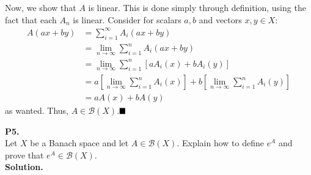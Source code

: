 \documentclass{article}
\begin{document}
    Now, we show that $A$ is linear. This is done simply through
    definition, using the fact that each $A_n$ is linear. Consider for scalars $a,b$ and vectors $x,y\in X$:
    \begin{align*}
        A(ax + by) &= \sum_{i=1}^{\infty} A_i(ax+by) \\
            &= \lim_{n\to\infty} \sum_{i=1}^n A_i(ax+by) \\
            &= \lim_{n\to\infty} \sum_{i=1}^n [aA_i(x) + bA_i(y)] \\
            &= a[\lim_{n\to\infty}\sum_{i=1}^n A_i(x)] + b[\lim_{n\to\infty}\sum_{i=1}^n A_i(y)] \\
            &= aA(x) + bA(y)
    \end{align*}
    as wanted. Thus, $A\in\mathcal{B}(X)$.$\hfill\blacksquare$
    
    \newpage

    \textbf{P5.}\\

    Let $X$ be a Banach space and let $A\in\mathcal{B}(X)$. Explain how to define $e^A$ and prove that $e^A\in\mathcal{B}(X)$.\\

    \textbf{Solution.}
\end{document}
